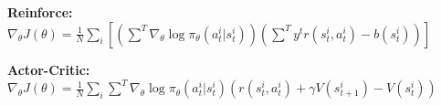 \textbf{Reinforce:} $\nabla_\theta J(\theta) = \frac{1}{N} \sum_i[(\sum^T \nabla_\theta \log \pi_\theta(a_t^i | s_t^i))(\sum^T y^t r(s_t^i, a_t^i) - b(s_t^i))]$\\

\textbf{Actor-Critic:} $\nabla_\theta J(\theta) = \frac{1}{N} \sum_i \sum^T \nabla_\theta \log \pi_\theta(a_t^i | s_t^i)(r(s_t^i, a_t^i) + \gamma V(s_{t+1}^i) - V(s_t^i))$\\

